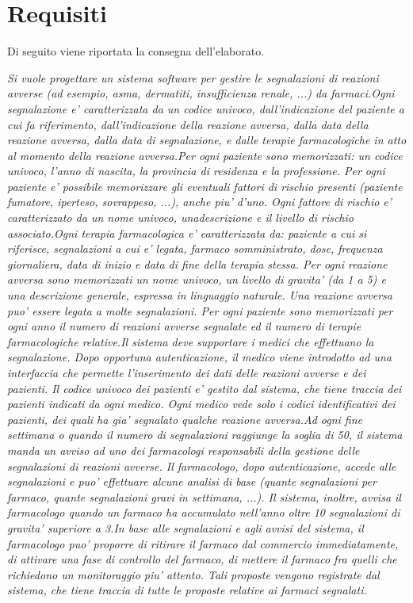 \documentclass[a4paper, 11pt]{article}
\begin{document}
	\section{Requisiti}
		Di seguito viene riportata la consegna dell'elaborato.	
	\begin{changemargin}{1cm}{0.5cm}
		\textit{Si vuole progettare un sistema software per gestire le segnalazioni di reazioni avverse (ad esempio, asma, dermatiti, insufficienza renale, ...) da farmaci.\newline Ogni segnalazione e' caratterizzata da un codice univoco, dall'indicazione del paziente a cui fa riferimento, dall'indicazione della reazione avversa, dalla data della reazione avversa, dalla data di segnalazione, e dalle terapie farmacologiche in atto al momento della reazione avversa.\newline Per ogni paziente sono memorizzati: un codice univoco, l'anno di nascita, la provincia di residenza e la professione. Per ogni paziente e' possibile memorizzare gli eventuali fattori di rischio presenti (paziente fumatore, iperteso, sovrappeso, ...), anche piu' d'uno. Ogni fattore di rischio e' caratterizzato da un nome univoco, unadescrizione e il livello di rischio associato.\newline Ogni terapia farmacologica e' caratterizzata da: paziente a cui si riferisce, segnalazioni a cui e' legata, farmaco somministrato, dose, frequenza giornaliera, data di inizio e data di fine della terapia stessa. Per ogni reazione avversa sono memorizzati un nome univoco, un livello di gravita' (da 1 a 5) e una descrizione generale, espressa in linguaggio naturale. Una reazione avversa puo' essere legata a molte segnalazioni. Per ogni paziente sono memorizzati per ogni anno il numero di reazioni avverse segnalate ed il numero di terapie farmacologiche relative.\newline Il sistema deve supportare i medici che effettuano la segnalazione. Dopo opportuna autenticazione, il medico viene introdotto ad una interfaccia che permette l'inserimento dei dati delle reazioni avverse e dei pazienti. Il codice univoco dei pazienti e' gestito dal sistema, che tiene traccia dei pazienti indicati da ogni medico. Ogni medico vede solo i codici identificativi dei pazienti, dei quali ha gia' segnalato qualche reazione avversa.\newline Ad ogni fine settimana o quando il numero di segnalazioni raggiunge la soglia di 50, il sistema manda un avviso ad uno dei farmacologi responsabili della gestione delle segnalazioni di reazioni avverse. Il farmacologo, dopo autenticazione, accede alle segnalazioni e puo' effettuare alcune analisi di base (quante segnalazioni per farmaco, quante segnalazioni gravi in settimana, ...). Il sistema, inoltre, avvisa il farmacologo quando un farmaco ha accumulato nell'anno oltre 10 segnalazioni di gravita' superiore a 3.\newline In base alle segnalazioni e agli avvisi del sistema, il farmacologo puo' proporre di ritirare il farmaco dal commercio immediatamente, di attivare una fase di controllo del farmaco, di mettere il farmaco fra quelli che richiedono un monitoraggio piu' attento. Tali proposte vengono registrate dal sistema, che tiene traccia di tutte le proposte relative ai farmaci segnalati.}

\end{changemargin}
\end{document}
